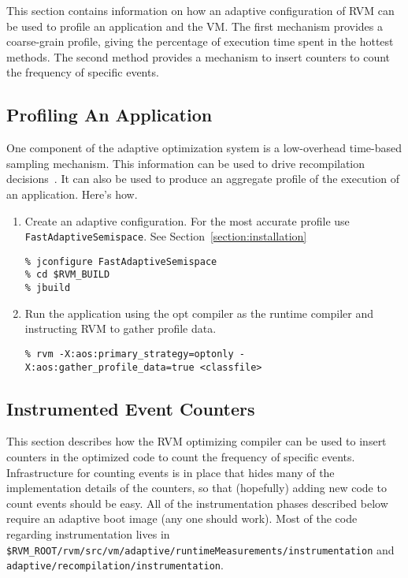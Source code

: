This section contains information on how an adaptive configuration of
RVM can be used to profile an application and the VM.  The first
mechanism provides a coarse-grain profile, giving the percentage of
execution time spent in the hottest methods.  The second method
provides a mechanism to insert counters to count the frequency of 
specific events. 

\subsection{Profiling An Application}
One component of the adaptive optimization system is a low-overhead
time-based sampling mechanism.  This information can be used to drive
recompilation decisions\T~\cite{jalapeno-adaptive-00}.
It can also be used to produce an aggregate
profile of the execution of an application.  
Here's how.

\begin{enumerate}
\item Create an adaptive configuration.  For the most accurate profile use
{\tt FastAdaptiveSemispace}.  See Section~\ref{section:installation}
\begin{verbatim}
% jconfigure FastAdaptiveSemispace
% cd $RVM_BUILD
% jbuild
\end{verbatim}

\item Run the application using the opt compiler as the runtime compiler and
instructing RVM to gather profile data.
\begin{verbatim}
% rvm -X:aos:primary_strategy=optonly -X:aos:gather_profile_data=true <classfile>
\end{verbatim}
\end{enumerate}

\subsection{Instrumented Event Counters}
\label{counting_events}
This section describes how the RVM optimizing compiler can be used to
insert counters in the optimized code to count the frequency of
specific events.  Infrastructure for counting events is in place that
hides many of the implementation details of the counters, so that
(hopefully) adding new code to count events should be easy.  All of
the instrumentation phases described below require an adaptive boot
image (any one should work).  Most of the code regarding
instrumentation lives in {\tt
\$RVM\_ROOT/rvm/src/vm/adaptive/runtimeMeasurements/instrumentation} and {\tt
adaptive/recompilation/instrumentation}.

